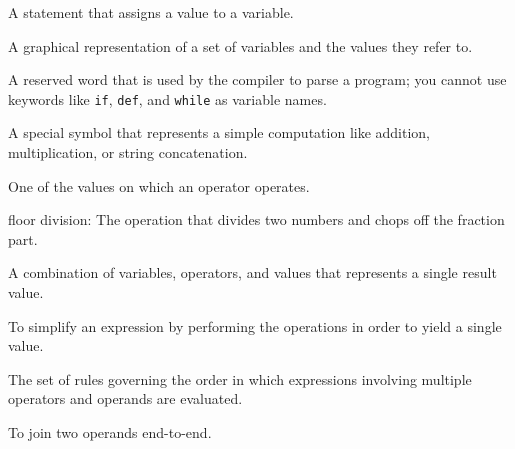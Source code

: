 \begin{vocabulary}[assignment:]  A statement that assigns a value to a variable.
\end{vocabulary}
	
\begin{vocabulary}  A graphical representation of a set of variables and the
values they refer to.
\end{vocabulary}
	
\begin{vocabulary}[keyword:]  A reserved word that is used by the compiler to parse a
program; you cannot use keywords like {\tt if}, {\tt  def}, and {\tt while} as
variable names.
\end{vocabulary}
	
\begin{vocabulary}[operator:]  A special symbol that represents a simple computation like
addition, multiplication, or string concatenation.
\end{vocabulary}
	
\begin{vocabulary}[operand:]  One of the values on which an operator operates.

\item[floor division:] The operation that divides two numbers and chops off
the fraction part.
\end{vocabulary}
	
\begin{vocabulary}[expression:]  A combination of variables, operators, and values that
represents a single result value.
\end{vocabulary}
	
\begin{vocabulary}[evaluate:]  To simplify an expression by performing the operations
in order to yield a single value.
\end{vocabulary}
	
\begin{vocabulary}  The set of rules governing the order in which
expressions involving multiple operators and operands are evaluated.
\end{vocabulary}
	
\begin{vocabulary}[concatenate:]  To join two operands end-to-end.
\end{vocabulary}
	
